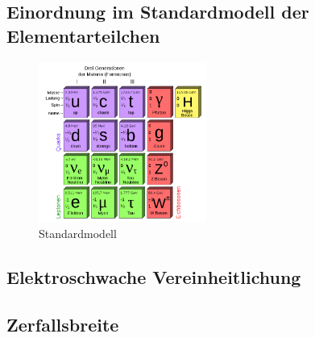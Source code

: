 \subsection{Einordnung im Standardmodell der Elementarteilchen}

\begin{iframe}
	\begin{figure}
		\centering
		\includegraphics[width=5.5cm]{img/standardmodel}
		\caption{Standardmodell\cite{standardmodel}}
	\end{figure}
	
\end{iframe}
\subsection{Elektroschwache Vereinheitlichung}
\subsection{Zerfallsbreite}
